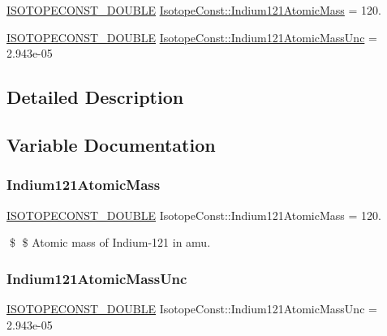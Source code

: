 \begin{DoxyCompactItemize}
\item 
\mbox{\hyperlink{group___isotope_const-_macros_ga8f45a7272ce02c0b4c65c44636ed719a}{I\+S\+O\+T\+O\+P\+E\+C\+O\+N\+S\+T\+\_\+\+D\+O\+U\+B\+LE}} \mbox{\hyperlink{group___isotope_const-_indium-_in121_ga6ffd2917e763926a6111b6c228e47d16}{Isotope\+Const\+::\+Indium121\+Atomic\+Mass}} = 120.
\item 
\mbox{\hyperlink{group___isotope_const-_macros_ga8f45a7272ce02c0b4c65c44636ed719a}{I\+S\+O\+T\+O\+P\+E\+C\+O\+N\+S\+T\+\_\+\+D\+O\+U\+B\+LE}} \mbox{\hyperlink{group___isotope_const-_indium-_in121_ga58011b55546cc9f98a6e4434e6e5999e}{Isotope\+Const\+::\+Indium121\+Atomic\+Mass\+Unc}} = 2.\+943e-\/05
\end{DoxyCompactItemize}


\subsection{Detailed Description}


\subsection{Variable Documentation}
\mbox{\label{group___isotope_const-_indium-_in121_ga6ffd2917e763926a6111b6c228e47d16}} 
\subsubsection{\texorpdfstring{Indium121\+Atomic\+Mass}{Indium121AtomicMass}}
{\footnotesize\ttfamily \mbox{\hyperlink{group___isotope_const-_macros_ga8f45a7272ce02c0b4c65c44636ed719a}{I\+S\+O\+T\+O\+P\+E\+C\+O\+N\+S\+T\+\_\+\+D\+O\+U\+B\+LE}} Isotope\+Const\+::\+Indium121\+Atomic\+Mass = 120.}

\$ \$ Atomic mass of Indium-\/121 in amu. \mbox{\label{group___isotope_const-_indium-_in121_ga58011b55546cc9f98a6e4434e6e5999e}} 
\subsubsection{\texorpdfstring{Indium121\+Atomic\+Mass\+Unc}{Indium121AtomicMassUnc}}
{\footnotesize\ttfamily \mbox{\hyperlink{group___isotope_const-_macros_ga8f45a7272ce02c0b4c65c44636ed719a}{I\+S\+O\+T\+O\+P\+E\+C\+O\+N\+S\+T\+\_\+\+D\+O\+U\+B\+LE}} Isotope\+Const\+::\+Indium121\+Atomic\+Mass\+Unc = 2.\+943e-\/05}

